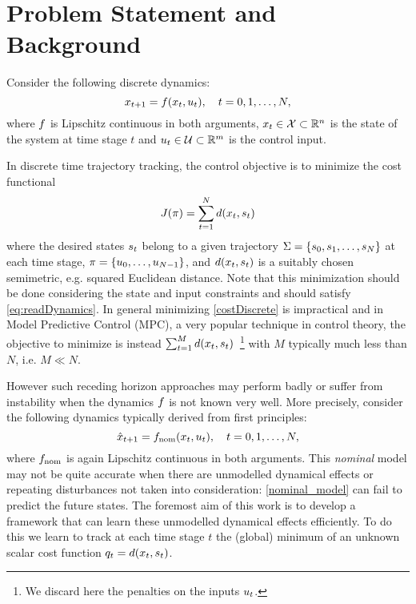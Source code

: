 \section{Problem Statement and Background}\label{sec:bground}

Consider the following discrete dynamics:
\begin{equation}
x_{t+1} = f(x_t,u_t), \quad  t = 0,1, \ldots, N,
\label{eq:readDynamics}
\end{equation}
where $f$ is Lipschitz continuous in both arguments, $x_t \in \mathcal{X} \subset \mathbb{R}^n$ is the state of the system at time stage $t$  and $u_t \in \mathcal{U} \subset \mathbb{R}^m$ is the control input.  

In discrete time trajectory tracking, the control objective is to minimize the cost functional
\begin{equation}
J(\mathbf{\pi}) = \sum_{t=1}^{N} d(x_{t}, s_{t}) \label{costDiscrete}
\end{equation}
where the desired states $s_{t}$ belong to a given trajectory $\Sigma = \{s_0, s_1, \ldots, s_N\}$ at each time stage, $\mathbf{\pi} = \{u_0, \ldots, u_{N-1}\}$, and $d(x_{t}, s_{t})$ is a suitably chosen semimetric, e.g. squared Euclidean distance. Note that this minimization should be done considering the state and input constraints and should satisfy \eqref{eq:readDynamics}. In general minimizing \eqref{costDiscrete} is impractical and in Model Predictive Control (MPC), a very popular technique in control theory, the objective to minimize is instead $\sum_{t=1}^{M} d(x_{t}, s_{t})$~\footnote{We discard here the penalties on the inputs $u_t$.} with $M$ typically much less than $N$, i.e. $M \ll N$.

However such receding horizon approaches may perform badly or suffer from instability when the dynamics $f$ is not known very well. More precisely, consider the following dynamics typically derived from first principles:
\begin{equation}
\hat{x}_{t+1} = f_{\mathrm{nom}}(x_t,u_t), \quad  t = 0,1, \ldots, N,
\label{nominal_model}
\end{equation}
where $f_{\mathrm{nom}}$ is again Lipschitz continuous in both arguments. This \emph{nominal} model may not be quite accurate when there are unmodelled dynamical effects or repeating disturbances not taken into consideration: \eqref{nominal_model} can fail to predict the future states. The foremost aim of this work is to develop a framework that can learn these unmodelled dynamical effects efficiently. To do this we learn to track at each time stage $t$ the (global) minimum of an unknown scalar cost function $q_{t} = d(x_{t},s_{t})$. 

